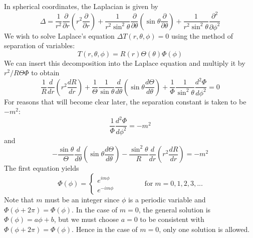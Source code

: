 In spherical coordinates, the Laplacian is given by
\[
\Delta = 
\frac{1}{r^2} \frac{\partial }{\partial r} \left( r^2 \frac{\partial }{\partial r} \right)
+
\frac{1}{r^2 \sin^2 \theta} \frac{\partial}{\partial \theta} \left( \sin\theta \frac{\partial }{\partial \theta} \right)
+
\frac{1}{r^2 \sin^2 \theta} \frac{\partial^2}{\partial \phi^2}
\]
We wish to solve Laplace's equation $\Delta T(r,\theta,\phi)=0$ using the method 
of separation of variables:
\[
T(r,\theta,\phi) = R(r) \Theta(\theta) \Phi(\phi)
\]
We can insert this decomposition into the Laplace equation and multiply it by $r^2/R\Theta\Phi$ to obtain
\[
\frac{1}{R} \frac{d}{dr} \left( r^2 \frac{dR}{dr} \right) 
+ 
\frac{1}{\Theta} \frac{1}{\sin \theta} \frac{d}{d\theta} \left( \sin \theta \frac{d\Theta}{d\theta} \right)
+
\frac{1}{\Phi} \frac{1}{\sin^2 \theta} \frac{d^2\Phi}{d\phi^2}
=
0
\]
For reasons that will become clear later, the separation constant  is taken to be $-m^2$:
\begin{equation}
\frac{1}{\Phi} \frac{d^2\Phi}{d\phi^2} = -m^2
\label{eq:spha2}
\end{equation}
and 
\begin{equation}
-\frac{\sin\theta}{\Theta} \frac{d}{d\theta} \left( \sin \theta \frac{d\Theta}{d\theta} \right)
- \frac{\sin^2\theta}{R} \frac{d}{dr} \left( r^2 \frac{dR}{dr} \right) = -m^2
\label{eq:spha2}
\end{equation}
The first equation yields
\[
\Phi(\phi) = 
\left\{
\begin{array}{c}
e^{im\phi} \\ e^{-im\phi}
\end{array}
\right.
\qquad\qquad 
\text{for} \; m=0,1,2,3,...
\]
Note that $m$ must be an integer since $\phi$ is a periodic variable and $\Phi(\phi + 2\pi) = \Phi(\phi)$. 
In the case of $m=0$, the general solution is $\Phi(\phi) = a\phi + b$, but we must choose $a=0$ to
be consistent with $\Phi(\phi + 2\pi) = \Phi(\phi)$. Hence in the case of $m = 0$, only one solution is
allowed.

